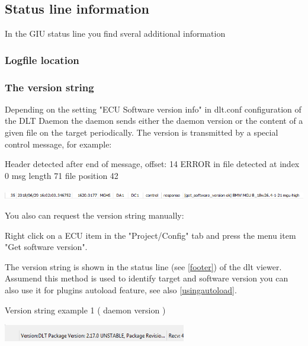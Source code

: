 \documentclass[a4paper,11pt]{article}
\begin{document}
\pagebreak
\subsection{Status line information}

In the GIU status line you find sveral additional information

\subsubsection{Logfile location}


\subsubsection{The version string}
\label{versionstring}
Depending on the setting "ECU Software version info" in dlt.conf configuration of the DLT Daemon
the daemon sends either the daemon version or the content of a given file on the target periodically.
The version is transmitted by a special control message, for example:

Header detected after end of message, offset: 14
ERROR in file detected at index 0 msg length 71 file position 42

\includegraphics[width=1.0\textwidth]{images/versionstring_message.png}

You also can request the version string manually:

Right click on a ECU item in the "Project/Config" tab and press the menu item "Get software version".


The version string is shown in the status line (see \autoref{footer}) of the dlt viewer.
Assumend this method is used to identify target and software version you can also use it for plugins
autoload feature, see also \autoref{usingautoload}.\linebreak

Version string example 1 ( daemon version )\linebreak

\vspace{0.3cm}

\includegraphics[width=0.6\textwidth]{images/versionstring_daemon.png}
\end{document}
